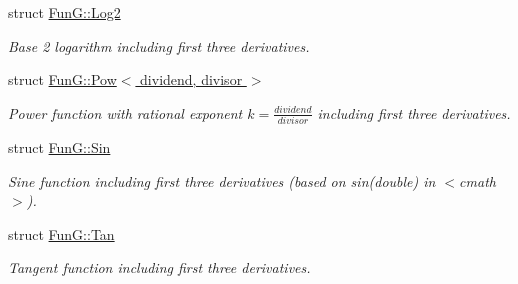 \begin{DoxyCompactItemize}
struct \hyperlink{structFunG_1_1Log2}{Fun\-G\-::\-Log2}
\begin{DoxyCompactList}\small\item\em Base 2 logarithm including first three derivatives. \end{DoxyCompactList}\item 
struct \hyperlink{structFunG_1_1Pow}{Fun\-G\-::\-Pow$<$ dividend, divisor $>$}
\begin{DoxyCompactList}\small\item\em Power function with rational exponent $ k = \frac{dividend}{divisor} $ including first three derivatives. \end{DoxyCompactList}\item 
struct \hyperlink{structFunG_1_1Sin}{Fun\-G\-::\-Sin}
\begin{DoxyCompactList}\small\item\em Sine function including first three derivatives (based on sin(double) in $<$cmath$>$). \end{DoxyCompactList}\item 
struct \hyperlink{structFunG_1_1Tan}{Fun\-G\-::\-Tan}
\begin{DoxyCompactList}\small\item\em Tangent function including first three derivatives. \end{DoxyCompactList}\end{DoxyCompactItemize}
